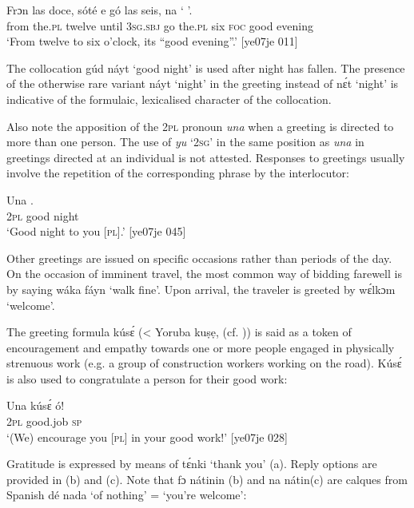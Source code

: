 \ea%
    \label{ex:key:1691}
    \gll Frɔn    las    doce,  sóté    e    gó  las    seis,
na  ‘    ’.\\
from  the.\textsc{pl}  twelve  until  \textsc{3sg.sbj}  go  the.\textsc{pl}  six  
\textsc{foc}  good  evening\\
\glt ‘From twelve to six o’clock, its “good evening”.’ [ye07je 011]
\z

The collocation gúd náyt ‘good night’ is used after night has fallen. The presence of the otherwise rare variant náyt ‘night’ in the greeting instead of nɛ́t ‘night’ is indicative of the formulaic, lexicalised character of the collocation. 


Also note the apposition of the \textsc{2pl} pronoun \textit{una} when a greeting is directed to more than one person. The use of \textit{yu} ‘\textsc{2sg}’ in the same position as \textit{una} in greetings directed at an individual is not attested. Responses to greetings usually involve the repetition of the corresponding phrase by the interlocutor:



\ea%
    \label{ex:key:1692}
    \gll Una        .\\
\textsc{2pl}    good  night\\

\glt ‘Good night to you [\textsc{pl}].’ [ye07je 045]
\z

Other greetings are issued on specific occasions rather than periods of the day. On the occasion of imminent travel, the most common way of bidding farewell is by saying wáka fáyn ‘walk fine’. Upon arrival, the traveler is greeted by wɛ́lkɔm ‘welcome’. 

The greeting formula kúsɛ́ (< Yoruba kuṣẹ,  (cf. \citealt{Abraham1958})) is said as a token of encouragement and empathy towards one or more people engaged in physically strenuous work (e.g. a group of construction workers working on the road). Kúsɛ́ is also used to congratulate a person for their good work:


\ea%
    \label{ex:key:1693}
    \gll Una  kúsɛ́  ó!\\
\textsc{2pl}  good.job  \textsc{sp}\\

\glt ‘(We) encourage you [\textsc{pl}] in your good work!’ [ye07je 028]
\z

Gratitude is expressed by means of tɛ́nki ‘thank you’ (a). Reply options are provided in (b) and (c). Note that fɔ nátinin (b) and na nátin(c) are calques{\fff} from Spanish dé nada ‘of nothing’ = ‘you’re welcome’: 


